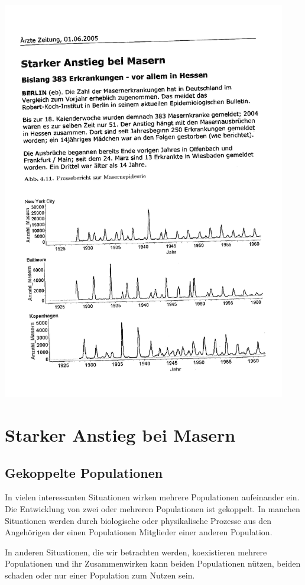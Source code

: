 \documentclass[%
11pt,%
twoside,%
titlepage,%
german,%
headsepline%
]{scrartcl}
\begin{document}
\includegraphics[width=0.93\textwidth,page=1,angle=-1.6]{pictures/starkeranstiegzeitung.pdf}

\pagebreak

\section{Starker Anstieg bei Masern}
\subsection{Gekoppelte Populationen}
In
vielen interessanten Situationen wirken mehrere Populationen aufeinander ein. Die
Entwicklung von zwei oder mehreren Populationen ist gekoppelt. In manchen Situationen werden durch biologische oder physikalische Prozesse aus den Angehörigen der einen Populationen Mitglieder einer anderen Population.

In anderen Situationen, die wir betrachten werden, koexistieren mehrere Populationen und ihr Zusammenwirken kann beiden Populationen nützen, beiden schaden oder nur einer Population zum Nutzen sein.
\end{document}

